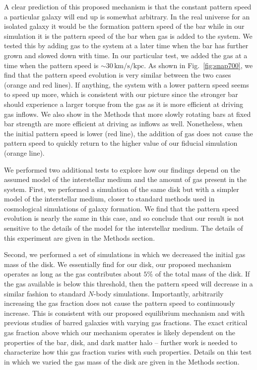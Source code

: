 \documentclass{natureprintstyle}
\newcommand{\Nbody}{$N$-body}
\begin{document}
A clear prediction of this proposed mechanism is that the constant pattern
speed a particular galaxy will end up is somewhat arbitrary. In the real
universe for an isolated galaxy it would be the formation pattern speed of the
bar while in our simulation it is the pattern speed of the bar when gas is
added to the system. We tested this by adding gas to the system at a later
time when the bar has further grown and slowed down with time. In our
particular test, we added the gas at a time when the pattern speed is
$\sim30\,\textrm{km}/\textrm{s}/\textrm{kpc}$. As shown in
Fig.~\ref{fig:snap700}, we find that the pattern speed evolution is very
similar between the two cases (orange and red lines). If anything, the system
with a lower pattern speed seems to speed up more, which is consistent with
our picture since the stronger bar should experience a larger torque from the
gas as it is more efficient at driving gas inflows. We also show in the
Methods that more slowly rotating bars at fixed bar strength are more
efficient at driving as inflows as well. Nonetheless, when the initial pattern
speed is lower (red line), the addition of gas does not cause the pattern
speed to quickly return to the higher value of our fiducial simulation (orange
line).

We performed two additional tests to explore how our findings depend on the
assumed model of the interstellar medium and the amount of gas present in the
system. First, we performed a simulation of the same disk but with a simpler
model of the interstellar medium\cite{2003MNRAS.339..289S}, closer to standard
methods used in cosmological simulations of galaxy formation. We find that the
pattern speed evolution is nearly the same in this case, and so conclude that
our result is not sensitive to the details of the model for the interstellar
medium. The details of this experiment are given in the Methods section.

Second, we performed a set of simulations in which we decreased the initial
gas mass of the disk. We essentially find for our disk, our proposed mechanism
operates as long as the gas contributes about $5\%$ of the total mass of the
disk. If the gas available is below this threshold, then the pattern speed
will decrease in a similar fashion to standard \Nbody{} simulations.
Importantly, arbitrarily increasing the gas fraction does not cause the
pattern speed to continuously increase. This is consistent with our proposed
equilibrium mechanism and with previous studies of barred galaxies with varying gas fractions.\cite{2010ApJ...719.1470V} The exact critical gas
fraction above which our mechanism operates is likely dependent on the
properties of the bar, disk, and dark matter halo -- further work is needed to
characterize how this gas fraction varies with such properties. Details on
this test in which we varied the gas mass of the disk are given in the Methods
section.
\end{document}
